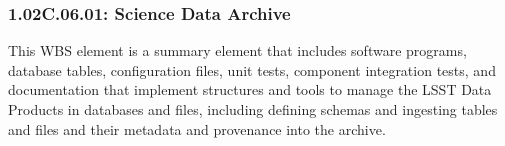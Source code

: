 \subsubsection*{1.02C.06.01: Science Data Archive}

This WBS element is a summary element that includes software programs, database tables, configuration files, unit tests, component integration tests, and documentation that implement structures and tools to manage the LSST Data Products in databases and files, including defining schemas and ingesting tables and files and their metadata and provenance into the archive.
